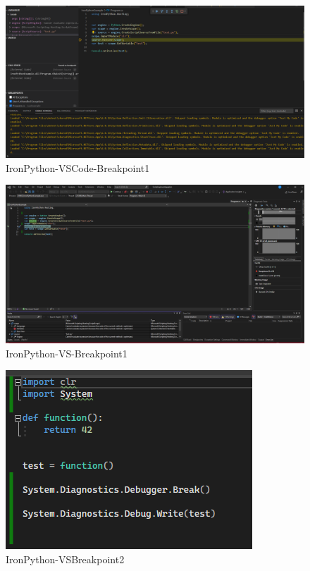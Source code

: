\begin{itemize}
    \begin{figure}[H]
        \centering
        \includegraphics[scale=0.5]{pics/IronPythonVSCodeBreakpoint1.png}
        \caption{IronPython-VSCode-Breakpoint1}
        \label{fig:impl:IronPythonVSCodeBreakpoint1}
    \end{figure}

    \begin{figure}[H]
        \centering
        \includegraphics[scale=0.5]{pics/IronPythonVSBreakpoint1.png}
        \caption{IronPython-VS-Breakpoint1}
        \label{fig:impl:IronPythonVSBreakpoint1}
    \end{figure}

    \begin{figure}[H]
        \centering
        \includegraphics{pics/IronPythonVSBreakpoint2.png}
        \caption{IronPython-VSBreakpoint2}
        \label{fig:impl:IronPythonVSBreakpoint2}
    \end{figure}


\end{itemize}
